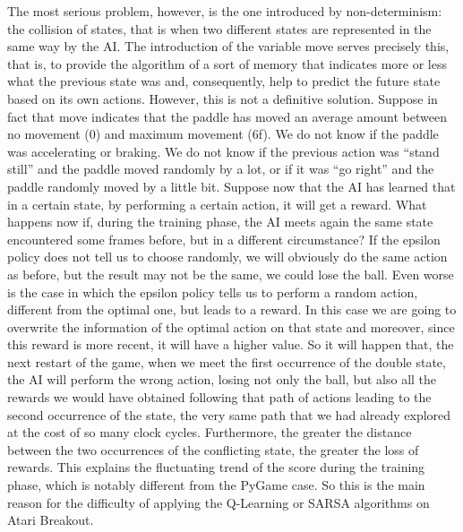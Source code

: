 The most serious problem, however, is the one introduced by non-determinism:
the collision of states, that is when two different states are represented in
the same way by the AI. The introduction of the variable move serves precisely
this, that is, to provide the algorithm of a sort of memory that indicates
more or less what the previous state was and, consequently, help to predict
the future state based on its own actions. However, this is not a definitive
solution. Suppose in fact that move indicates that the paddle has moved an
average amount between no movement (0) and maximum movement (6f). We do not
know if the paddle was accelerating or braking. We do not know if the previous
action was ``stand still'' and the paddle moved randomly by a lot, or if it was
``go right'' and the paddle randomly moved by a little bit. Suppose now that the
AI has learned that in a certain state, by performing a certain action, it
will get a reward. What happens now if, during the training phase, the AI
meets again the same state encountered some frames before, but in a different
circumstance? If the epsilon policy does not tell us to choose randomly,
we will obviously do the same action as before, but the result may not be the
same, we could lose the ball. Even worse is the case in which the epsilon
policy tells us to perform a random action, different from the optimal one,
but leads to a reward. In this case we are going to overwrite the information
of the optimal action on that state and moreover, since this reward is more
recent, it will have a higher value. So it will happen that, the next restart
of the game, when we meet the first occurrence of the double state, the AI
will perform the wrong action, losing not only the ball, but also all the
rewards we would have obtained following that path of actions leading to the
second occurrence of the state, the very same path that we had already explored
at the cost of so many clock cycles. Furthermore, the greater the distance
between the two occurrences of the conflicting state, the greater the loss of
rewards. This explains the fluctuating trend of the score during the training
phase, which is notably different from the PyGame case. So this is the main
reason for the difficulty of applying the Q-Learning or SARSA algorithms on
Atari Breakout.

